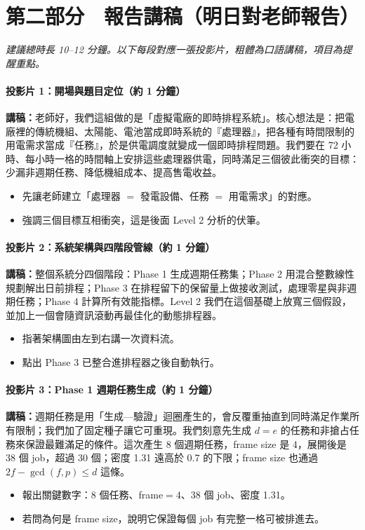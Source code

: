 \documentclass[12pt,a4paper,fontset=none]{ctexart}
\begin{document}
\newpage
\part*{第二部分　報告講稿（明日對老師報告）}
\textit{建議總時長 10--12 分鐘。以下每段對應一張投影片，粗體為口語講稿，項目為提醒重點。}

\subsection*{投影片 1：開場與題目定位（約 1 分鐘）}
\textbf{講稿：}老師好，我們這組做的是「虛擬電廠的即時排程系統」。核心想法是：把電廠裡的傳統機組、太陽能、電池當成即時系統的『處理器』，把各種有時間限制的用電需求當成『任務』，於是供電調度就變成一個即時排程問題。我們要在 72 小時、每小時一格的時間軸上安排這些處理器供電，同時滿足三個彼此衝突的目標：少漏非週期任務、降低機組成本、提高售電收益。
\begin{itemize}
  \item 先讓老師建立「處理器 $=$ 發電設備、任務 $=$ 用電需求」的對應。
  \item 強調三個目標互相衝突，這是後面 Level 2 分析的伏筆。
\end{itemize}

\subsection*{投影片 2：系統架構與四階段管線（約 1 分鐘）}
\textbf{講稿：}整個系統分四個階段：Phase 1 生成週期任務集；Phase 2 用混合整數線性規劃解出日前排程；Phase 3 在排程留下的保留量上做接收測試，處理零星與非週期任務；Phase 4 計算所有效能指標。Level 2 我們在這個基礎上放寬三個假設，並加上一個會隨資訊滾動再最佳化的動態排程器。
\begin{itemize}
  \item 指著架構圖由左到右講一次資料流。
  \item 點出 Phase 3 已整合進排程器之後自動執行。
\end{itemize}

\subsection*{投影片 3：Phase 1 週期任務生成（約 1 分鐘）}
\textbf{講稿：}週期任務是用「生成—驗證」迴圈產生的，會反覆重抽直到同時滿足作業所有限制；我們加了固定種子讓它可重現。我們刻意先生成 $d=e$ 的任務和非搶占任務來保證最難滿足的條件。這次產生 8 個週期任務，frame size 是 4，展開後是 38 個 job，超過 30 個；密度 1.31 遠高於 0.7 的下限；frame size 也通過 $2f-\gcd(f,p)\le d$ 這條。
\begin{itemize}
  \item 報出關鍵數字：8 個任務、frame$=4$、38 個 job、密度 1.31。
  \item 若問為何是 frame size，說明它保證每個 job 有完整一格可被排進去。
\end{itemize}
\end{document}
